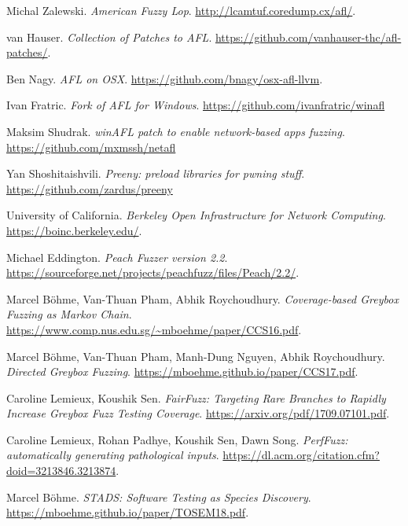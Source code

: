 \begin{thebibliography}{99} %

  Michal Zalewski. %
  \textit{American Fuzzy Lop}. %
  \url{http://lcamtuf.coredump.cx/afl/}. %

  van Hauser.
  \textit{Collection of Patches to AFL}.
  \url{https://github.com/vanhauser-thc/afl-patches/}.

  Ben Nagy.
  \textit{AFL on OSX}.
  \url{https://github.com/bnagy/osx-afl-llvm}.

  Ivan Fratric.
  \textit{Fork of AFL for Windows}.
  \url{https://github.com/ivanfratric/winafl}

  Maksim Shudrak.
  \textit{winAFL patch to enable network-based apps fuzzing}.
  \url{https://github.com/mxmssh/netafl}

  Yan Shoshitaishvili.
  \textit{Preeny: preload libraries for pwning stuff}.
  \url{https://github.com/zardus/preeny}

  University of California.
  \textit{Berkeley Open Infrastructure for Network Computing}.
  \url{https://boinc.berkeley.edu/}.

  Michael Eddington.
  \textit{Peach Fuzzer version 2.2}.
  \url{https://sourceforge.net/projects/peachfuzz/files/Peach/2.2/}.

  Marcel B\"ohme, Van-Thuan Pham, Abhik Roychoudhury.
  \textit{Coverage-based Greybox Fuzzing as Markov Chain}.
  \url{https://www.comp.nus.edu.sg/~mboehme/paper/CCS16.pdf}.

  Marcel B\"ohme, Van-Thuan Pham, Manh-Dung Nguyen, Abhik Roychoudhury.
  \textit{Directed Greybox Fuzzing}.
  \url{https://mboehme.github.io/paper/CCS17.pdf}.

  Caroline Lemieux, Koushik Sen.
  \textit{FairFuzz: Targeting Rare Branches to Rapidly Increase Greybox Fuzz Testing Coverage}.
  \url{https://arxiv.org/pdf/1709.07101.pdf}.

  Caroline Lemieux, Rohan Padhye, Koushik Sen, Dawn Song.
  \textit{PerfFuzz: automatically generating pathological inputs}.
  \url{https://dl.acm.org/citation.cfm?doid=3213846.3213874}.

  Marcel B\"ohme.
  \textit{STADS: Software Testing as Species Discovery}.
  \url{https://mboehme.github.io/paper/TOSEM18.pdf}.


\end{thebibliography}
